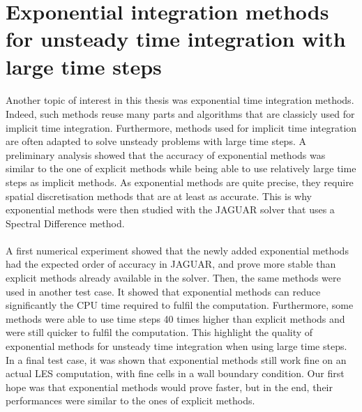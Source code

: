   \section*{Exponential integration methods for unsteady time integration with large time steps}

    \paragraph{}
    Another topic of interest in this thesis was exponential time integration methods.
    Indeed, such methods reuse many parts and algorithms that are classicly used for implicit time integration.
    Furthermore, methods used for implicit time integration are often adapted to solve unsteady problems with large time steps.
    A preliminary analysis showed that the accuracy of exponential methods was similar to the one of explicit methods while being able to use relatively large time steps as implicit methods.
    As exponential methods are quite precise, they require spatial discretisation methods that are at least as accurate.
    This is why exponential methods were then studied with the JAGUAR solver that uses a Spectral Difference method.

    \paragraph{}
    A first numerical experiment showed that the newly added exponential methods had the expected order of accuracy in JAGUAR, and prove more stable than explicit methods already available in the solver.
    Then, the same methods were used in another test case.
    It showed that exponential methods can reduce significantly the CPU time required to fulfil the computation.
    Furthermore, some methods were able to use time steps 40 times higher than explicit methods and were still quicker to fulfil the computation.
    This highlight the quality of exponential methods for unsteady time integration when using large time steps.
    In a final test case, it was shown that exponential methods still work fine on an actual LES computation, with fine cells in a wall boundary condition.
    Our first hope was that exponential methods would prove faster, but in the end, their performances were similar to the ones of explicit methods.


